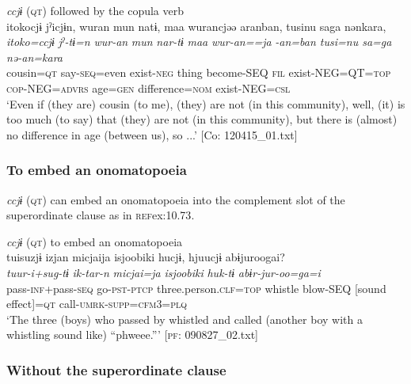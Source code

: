   \ex \textit{ccjɨ} (\textsc{qt}) followed by the copula verb\\
      \glll    {\textbar}itoko{\textbar}cjɨ  jˀicjɨn,  wuran  mun  natɨ,  {\textbar}maa{\textbar}   wurancjəə  aranban,  tusinu  {\textbar}sa{\textbar}ga  nənkara,\\
    \textit{itoko=ccjɨ}  \textit{jˀ-tɨ=n}  \textit{wur-an}  \textit{mun}  \textit{nar-tɨ}  \textit{maa} \textit{wur-an==ja}  \textit{-an=ban  tusi=nu  sa=ga  nə-an=kara}\\
    cousin=\textsc{qt}  say-\textsc{seq}=even  exist-\textsc{neg}  thing  become-SEQ  \textsc{fil} exist-NEG=QT=\textsc{top}  \textsc{cop}-NEG=\textsc{advrs}  age=\textsc{gen}  difference=\textsc{nom}  exist-NEG=\textsc{csl}\\
\glt     ‘Even if (they are) cousin (to me), (they) are not (in this community), well, (it) is too much (to say) that (they) are not (in this community), but there is (almost) no difference in age (between us), so ...’  [Co: 120415\_01.txt]
\z
\z

\subsubsection{To embed an onomatopoeia}\label{sec:10.4.1.6}

\textit{ccjɨ} (\textsc{qt}) can embed an onomatopoeia into the complement slot of the superordinate clause as in \textsc{ref}{ex:10.73}.

\ea\label{ex:10.73}   \textit{ccjɨ} (\textsc{qt}) to embed an onomatopoeia\\
      \glll    tuisuzjɨ  izjan  micjaija  isjoobiki  hucjɨ,  hjuucjɨ  abɨjuroogai?\\
    \textit{tuur-i+sug-tɨ}  \textit{ik-tar-n}  \textit{micjai=ja}  \textit{isjoobiki}  \textit{huk-tɨ}  \textit{}  \textit{abɨr-jur-oo=ga=i}\\
    pass-\textsc{inf}+pass-\textsc{seq}  go-\textsc{pst}-\textsc{ptcp}  three.person.\textsc{clf}=\textsc{top}  whistle  blow-SEQ  [sound effect]=\textsc{qt}  call-\textsc{umrk}-\textsc{supp}=\textsc{cfm}3=\textsc{plq}\\
    \glt     ‘The three (boys) who passed by whistled and called (another boy with a whistling sound like) “phweee.”’ [\textsc{pf}: 090827\_02.txt]
    \z

\subsubsection{Without the superordinate clause}\label{sec:10.4.1.7}

